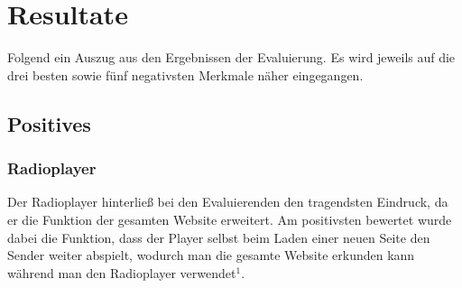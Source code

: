 \documentclass{article}
\begin{document}
	\section{Resultate}
	Folgend ein Auszug aus den Ergebnissen der Evaluierung. Es wird jeweils auf die drei besten sowie fünf negativsten Merkmale näher eingegangen.
	\subsection{Positives}
	\subsubsection{Radioplayer}
	Der Radioplayer hinterließ bei den Evaluierenden den tragendsten Eindruck, da er die Funktion der gesamten Website erweitert. Am positivsten bewertet wurde dabei die Funktion, dass der Player selbst beim Laden einer neuen Seite den Sender weiter abspielt, wodurch man die gesamte Website erkunden kann während man den Radioplayer verwendet\hyperref[sec:Anhang1]{$^1$}\label{ssub:radioplayer1}. \\
\end{document}
